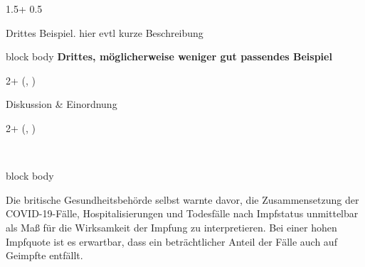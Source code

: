 \documentclass{beamer}
\newlength{\blockFour}
\begin{document}
\begin{frame}[t]
\begin{textblock*}{1.5\colwidth + 0.5\colsep}
\begin{alertblock}{%
	\begin{minipage}[b]{60pt}
		\RaggedRight
		\noindent\hspace{-10pt}
	\end{minipage}%
	\begin{minipage}[b]{2\colwidth+\colsep-125pt}\strut%
		Drittes Beispiel.\; {\mdseries hier evtl kurze Beschreibung}
	\end{minipage}%
}
	\begin{beamercolorbox}[
		ht = 12.75cm, 
		wd = 0.975\linewidth, 
		center
		]{block body}
		\textcolor{SpotColor}{\textbf{Drittes, möglicherweise weniger gut passendes Beispiel}}\\[46pt]
	\end{beamercolorbox}
\end{alertblock}

\end{textblock*}



\TPshowboxesfalse



\begin{textblock*}{2\colwidth + \colsep}(\leftmargin, \blockFour)

\begin{parblock}{Diskussion \& Einordnung}
\end{parblock}

\end{textblock*}




\begin{textblock*}{2\colwidth + \colsep}(\leftmargin, \blockFour)

\begin{parblock}{~}  %
	\begin{beamercolorbox}[
    wd=0.92\linewidth,
    sep=0.35cm,
    left
]{block body}

    \small
    Die britische Gesundheitsbehörde selbst warnte davor,
    die Zusammensetzung der COVID-19-Fälle, Hospitalisierungen
    und Todesfälle nach Impfstatus unmittelbar als Maß für
    die Wirksamkeit der Impfung zu interpretieren.
    Bei einer hohen Impfquote ist es erwartbar, dass ein
    beträchtlicher Anteil der Fälle auch auf Geimpfte entfällt.


\end{beamercolorbox}
\end{parblock}
\end{textblock*}
\end{frame}
\end{document}

